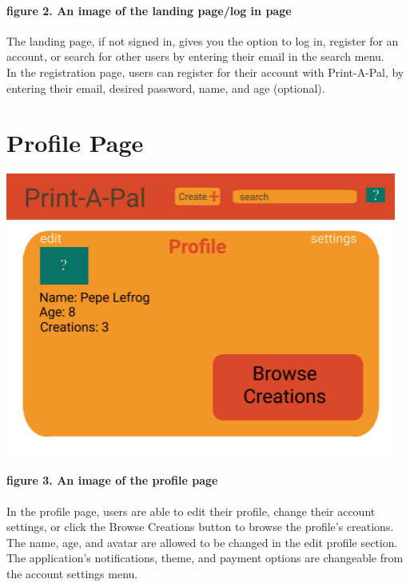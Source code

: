 \documentclass{report}
\begin{document}
\paragraph{figure 2. An image of the landing page/log in page}
The landing page, if not signed in, gives you the option to log in, register for an account, or search for other users by entering their email in the search menu. \\
 
\noindent In the registration page, users can register for their account with Print-A-Pal, by entering their email, desired password, name, and age (optional).  
\section{Profile Page}
\begin{center}
\includegraphics[width=\textwidth/2]{profile.png}
\end{center}
\paragraph{figure 3. An image of the profile page}
In the profile page, users are able to edit their profile, change their account settings, or click the Browse Creations button to browse the profile’s creations.  The name, age, and avatar are allowed to be changed in the edit profile section.  The application’s notifications, theme, and payment options are changeable from the account settings menu. 
 
\end{document}
